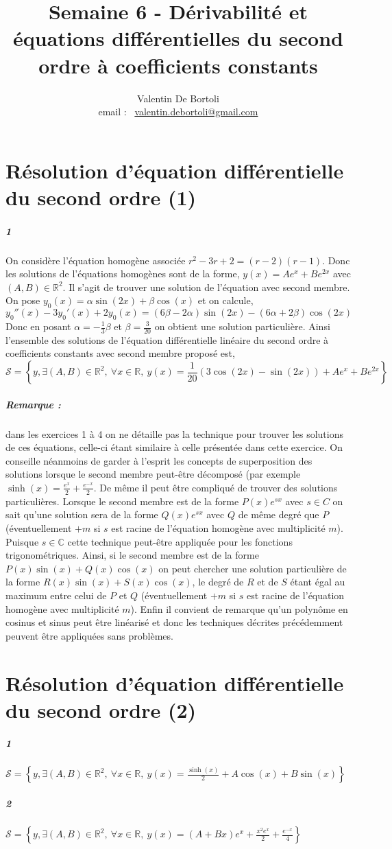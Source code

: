 \documentclass[10pt,a4paper]{article}
\title{Semaine 6 - Dérivabilité et équations différentielles du second ordre à coefficients constants}
\author{Valentin De Bortoli \\ email : \ \href{mailto:valentin.debortoli@gmail.com}{valentin.debortoli@gmail.com}}
\date{}
\begin{document}
\maketitle
\section{Résolution d'équation différentielle du second ordre (1)}
\subparagraph{1}On considère l'équation homogène associée $r^2-3r+2 = (r-2)(r-1)$. Donc les solutions de l'équations homogènes sont de la forme, $y(x) = Ae^x + Be^{2x}$ avec $(A,B) \in \mathbb{R}^2$. Il s'agit de trouver une solution de l'équation avec second membre. On pose $y_0(x) = \alpha\sin(2x) + \beta \cos(x)$ et on calcule,
\[
y_0''(x) - 3y_0'(x) +2y_0(x) = (6\beta - 2\alpha) \sin(2x) -(6\alpha +2\beta) \cos(2x)
\]
Donc en posant $\alpha = - \frac{1}{3}\beta$ et $\beta = \frac{3}{20}$ on obtient une solution particulière. Ainsi l'ensemble des solutions de l'équation différentielle linéaire du second ordre à coefficients constants avec second membre proposé est,
\[
\mathcal{S} = \left\lbrace y, \exists (A,B) \in \mathbb{R}^2, \ \forall x \in \mathbb{R}, \ y(x) = \frac{1}{20}\left( 3\cos(2x) - \sin(2x)\right) + Ae^x +Be^{2x}\right\rbrace
\]

\subparagraph{Remarque :} dans les exercices 1 à 4 on ne détaille pas la technique pour trouver les solutions de ces équations, celle-ci étant similaire à celle présentée dans cette exercice. On conseille néanmoins de garder à l'esprit les concepts de superposition des solutions lorsque le second membre peut-être décomposé (par exemple $\sinh(x) = \frac{e^x}{2} + \frac{e^{-x}}{2}$. De même il peut être compliqué de trouver des solutions particulières. Lorsque le second membre est de la forme $P(x)e^{s x}$ avec $s \in C$ on sait qu'une solution sera de la forme $Q(x)e^{s x}$ avec $Q$ de même degré que $P$ (éventuellement $+m$ si $s$ est racine de l'équation homogène avec multiplicité $m$). Puisque $s \in \mathbb{C}$ cette technique peut-être appliquée pour les fonctions trigonométriques. Ainsi, si le second membre est de la forme $P(x)\sin(x) + Q(x)\cos(x)$ on peut chercher une solution particulière de la forme $R(x)\sin(x) + S(x) \cos(x)$, le degré de $R$ et de $S$ étant égal au maximum entre celui de $P$ et $Q$ (éventuellement $+m$ si $s$ est racine de l'équation homogène avec multiplicité $m$). Enfin il convient de remarque qu'un polynôme en cosinus et sinus peut être linéarisé et donc les techniques décrites précédemment peuvent être appliquées sans problèmes.
\section{Résolution d'équation différentielle du second ordre (2)}
\subparagraph{1}\(
\mathcal{S} = \left\lbrace y, \exists (A,B) \in \mathbb{R}^2, \ \forall x \in \mathbb{R}, \ y(x) = \frac{\sinh(x)}{2}+A\cos(x) + B\sin(x)\right\rbrace
\)
\subparagraph{2}\(
\mathcal{S} = \left\lbrace y, \exists (A,B) \in \mathbb{R}^2, \ \forall x \in \mathbb{R}, \ y(x) = (A+Bx)e^x + \frac{x^2e^x}{2} + \frac{e^{-x}}{4}\right\rbrace
\)
\end{document}
